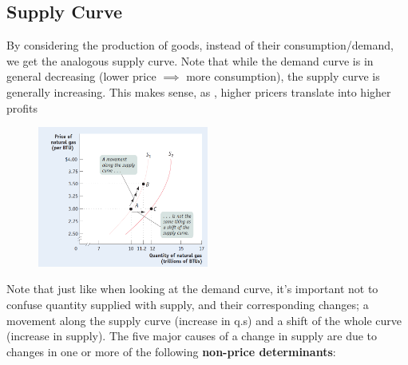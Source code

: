 \documentclass[english,course,draft]{Notes}
\begin{document}
	
		
\subsection{Supply Curve}


\par{By considering the production of goods, instead of their consumption/demand, we get the analogous supply curve. Note that while the demand curve is in general decreasing (lower price $\implies$ more consumption), the supply curve is generally increasing. This makes sense, as , higher pricers translate into higher profits}






\begin{figure}[ht]
\centering
\includegraphics[width=0.5\textwidth]{supplyCurve}
\end{figure}

\par{Note that just like when looking at the demand curve, it's important not to confuse quantity supplied with supply, and their corresponding changes; a movement along the supply curve (increase in q.s) and a shift of the whole curve (increase in supply). The five major causes of a change in supply are due to changes in one or more of the following \textbf{non-price determinants}:}
\end{document}
